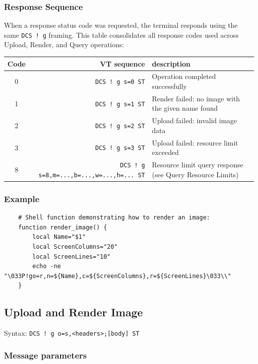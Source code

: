 \documentclass[a4paper]{article}
\newcommand{\code}[1]{\colorbox{light-gray}{\texttt{#1}}}
\begin{document}
\subsubsection*{Response Sequence}

When a response status code was requested, the terminal responds using the same
\code{DCS ! g} framing. This table consolidates all response codes used across
Upload, Render, and Query operations:

\begin{tabular}{ |c|r|l| }
    \hline
    \textbf{Code} & \textbf{VT sequence} & \textbf{description} \\
    \hline
    0 & \code{DCS ! g s=0 ST} & Operation completed successfully \\
    1 & \code{DCS ! g s=1 ST} & Render failed: no image with the given name found \\
    2 & \code{DCS ! g s=2 ST} & Upload failed: invalid image data \\
    3 & \code{DCS ! g s=3 ST} & Upload failed: resource limit exceeded \\
    8 & \code{DCS ! g s=8,m=...,b=...,w=...,h=... ST} & Resource limit query response (see Query Resource Limits) \\
    \hline
\end{tabular}

\subsubsection*{Example}

\begin{verbatim}
    # Shell function demonstrating how to render an image:
    function render_image() {
        local Name="$1"
        local ScreenColumns="20"
        local ScreenLines="10"
        echo -ne "\033P!go=r,n=${Name},c=${ScreenColumns},r=${ScreenLines}\033\\"
    }
\end{verbatim}

\subsection{Upload and Render Image} %

Syntax: \code{DCS ! g o=s,<headers>;[body] ST}

\subsubsection*{Message parameters}
\end{document}
